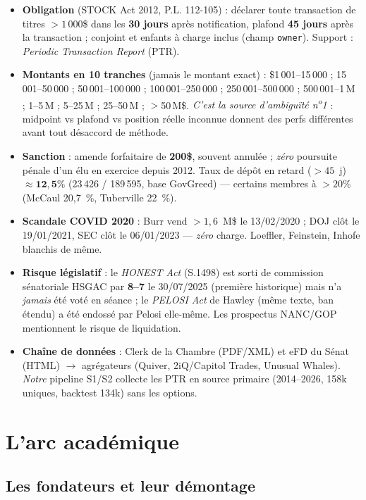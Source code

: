 \documentclass[11pt,a4paper]{article}
\newcommand{\code}[1]{\texttt{\small #1}}
\begin{document}
\begin{itemize}
  \item \textbf{Obligation} (STOCK Act 2012, P.L. 112-105) : déclarer toute transaction de titres $>1\,000$\$
  dans les \textbf{30 jours} après notification, plafond \textbf{45 jours} après la transaction ; conjoint et
  enfants à charge inclus (champ \code{owner}). Support : \emph{Periodic Transaction Report} (PTR).
  \item \textbf{Montants en 10 tranches} (jamais le montant exact) : \$1\,001--15\,000 ; 15\,001--50\,000 ;
  50\,001--100\,000 ; 100\,001--250\,000 ; 250\,001--500\,000 ; 500\,001--1\,M ; 1--5\,M ; 5--25\,M ;
  25--50\,M ; $>$50\,M\$. \emph{C'est la source d'ambiguïté n\textsuperscript{o}1} : midpoint vs plafond vs
  position réelle inconnue donnent des perfs différentes avant tout désaccord de méthode.
  \item \textbf{Sanction} : amende forfaitaire de \textbf{200\$}, souvent annulée ; \emph{zéro} poursuite
  pénale d'un élu en exercice depuis 2012. Taux de dépôt en retard ($>45$~j) $\approx \mathbf{12{,}5\%}$
  (23\,426 / 189\,595, base GovGreed) --- certains membres à $>20\%$ (McCaul 20,7~\%, Tuberville 22~\%).
  \item \textbf{Scandale COVID 2020} : Burr vend $>1{,}6$~M\$ le 13/02/2020 ; DOJ clôt le 19/01/2021, SEC clôt
  le 06/01/2023 --- \emph{zéro} charge. Loeffler, Feinstein, Inhofe blanchis de même.
  \item \textbf{Risque législatif} : le \emph{HONEST Act} (S.1498) est sorti de commission sénatoriale HSGAC
  par \textbf{8--7} le 30/07/2025 (première historique) mais n'a \emph{jamais} été voté en séance ; le
  \emph{PELOSI Act} de Hawley (même texte, ban étendu) a été endossé par Pelosi elle-même. Les prospectus
  NANC/GOP mentionnent le risque de liquidation.
  \item \textbf{Chaîne de données} : Clerk de la Chambre (PDF/XML) et eFD du Sénat (HTML) $\to$ agrégateurs
  (Quiver, 2iQ/Capitol Trades, Unusual Whales). \emph{Notre} pipeline S1/S2 collecte les PTR en source
  primaire (2014--2026, 158k uniques, backtest 134k) sans les options.
\end{itemize}

\section{L'arc académique}

\subsection{Les fondateurs et leur démontage}
\end{document}
